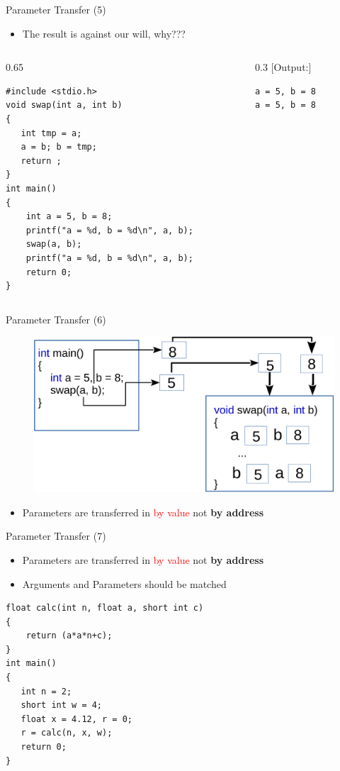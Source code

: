 \begin{frame}[fragile]{Parameter Transfer (5)}
\begin{itemize}
	\item {The result is against our will, why???}
\end{itemize}
\begin{columns}
\begin{column}{0.65\linewidth}
\begin{lstlisting}
#include <stdio.h>
void swap(int a, int b)
{
   int tmp = a;
   a = b; b = tmp;
   return ;
}
int main()
{
    int a = 5, b = 8;
    printf("a = %d, b = %d\n", a, b);
    swap(a, b);
    printf("a = %d, b = %d\n", a, b);
    return 0;
}
\end{lstlisting}
\end{column}
\begin{column}{0.3\linewidth}
[Output:]
\begin{lstlisting}
a = 5, b = 8
a = 5, b = 8
\end{lstlisting}
\end{column}
\end{columns}
\end{frame}

\begin{frame}[fragile]{Parameter Transfer (6)}
\begin{figure}
	\includegraphics[width=0.85\linewidth]{figs/swap.pdf}
\end{figure}
\begin{itemize}
	\item {Parameters are transferred in \textcolor{red}{by value} not \textbf{by address}}
\end{itemize}
\end{frame}

\begin{frame}[fragile]{Parameter Transfer (7)}
\begin{itemize}
	\item {Parameters are transferred in \textcolor{red}{by value} not \textbf{by address}}
	\item {Arguments and Parameters should be matched}
\end{itemize}
\begin{lstlisting}
float calc(int n, float a, short int c)
{
    return (a*a*n+c);
}
int main()
{
   int n = 2;
   short int w = 4;
   float x = 4.12, r = 0;
   r = calc(n, x, w);
   return 0;
}
\end{lstlisting}
\end{frame}

